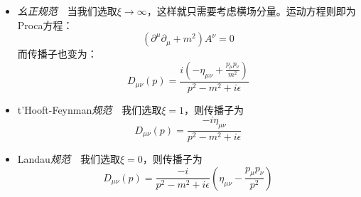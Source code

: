 \begin{itemize}
    \item \emph{幺正规范}~~当我们选取$\xi\rightarrow\infty$，这样就只需要考虑横场分量。运动方程则即为Proca方程：
\begin{equation}
(\partial^\mu\partial_\mu+m^2) A^\nu=0
\end{equation}
而传播子也变为：
\begin{equation}
D_{\mu\nu}(p)=\frac{i\left(-\eta_{\mu\nu}+\frac{p_\mu p_\nu}{m^2}\right)}{p^2-m^2+i\epsilon}
\end{equation}
\item t'Hooft-Feynman\emph{规范}~~我们选取$\xi=1$，则传播子为
\begin{equation}
D_{\mu\nu}(p)=\frac{-i\eta_{\mu\nu}}{p^2-m^2+i\epsilon}
\end{equation}
\item Landau\emph{规范}~~我们选取$\xi=0$，则传播子为
\begin{equation}
D_{\mu\nu}(p)=\frac{-i}{p^2-m^2+i\epsilon}\left(\eta_{\mu\nu}-\frac{p_\mu p_\nu}{p^2}\right)
\end{equation}
\end{itemize}




